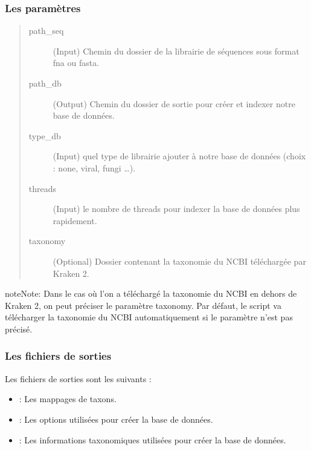 \documentclass[letterpaper,10pt,french]{sphinxmanual}
\begin{document}
\subsubsection{Les paramètres}
\label{\detokenize{tutorial:id22}}\begin{quote}\begin{description}
\item[{\sphinxhyphen{}path\_seq}] \leavevmode
(Input) Chemin du dossier de la librairie de séquences sous format fna ou fasta.

\item[{\sphinxhyphen{}path\_db}] \leavevmode
(Output) Chemin du dossier de sortie pour créer et indexer notre base de données.

\item[{\sphinxhyphen{}type\_db}] \leavevmode
(Input) quel type de librairie ajouter à notre base de données (choix : none, viral, fungi …).

\item[{\sphinxhyphen{}threads}] \leavevmode
(Input) le nombre de threads pour indexer la base de données plus rapidement.

\item[{\sphinxhyphen{}taxonomy}] \leavevmode
(Optional) Dossier contenant la taxonomie du NCBI téléchargée par Kraken 2.

\end{description}\end{quote}

\begin{sphinxadmonition}{note}{Note:}
Dans le cas où l’on a téléchargé la taxonomie du NCBI en dehors de Kraken 2, on peut préciser le paramètre \sphinxhyphen{}taxonomy. Par défaut, le script va télécharger la taxonomie du NCBI automatiquement si le paramètre n’est pas précisé.
\end{sphinxadmonition}


\subsubsection{Les fichiers de sorties}
\label{\detokenize{tutorial:id23}}
Les fichiers de sorties sont les suivants :
\begin{itemize}
\item {} 
 : Les mappages de taxons.

\item {} 
 : Les options utilisées pour créer la base de données.

\item {} 
 : Les informations taxonomiques utilisées pour créer la base de données.

\end{itemize}
\end{document}
